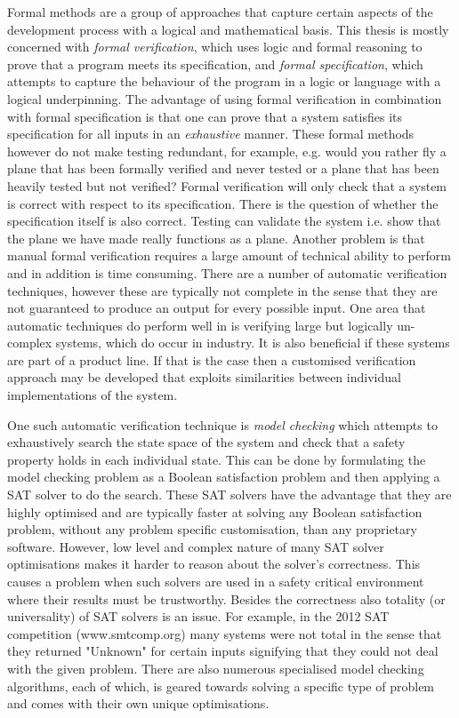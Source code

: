 Formal methods are a group of approaches that capture certain aspects of the development process with a logical and mathematical basis. This thesis is mostly concerned with \emph{formal verification}, which uses logic and formal reasoning to prove that a program meets its specification, and \emph{formal specification}, which attempts to capture the behaviour of the program in a logic or language with a logical underpinning. The advantage of using formal verification in combination with formal specification is that one can prove that a system satisfies its specification for all inputs in an \emph{exhaustive} manner. These formal methods however do not make testing redundant, for example, e.g. would you rather fly a plane that has been formally verified and never tested or a plane that has been heavily tested but not verified? Formal verification will only check that a system is correct with respect to its specification. There is the question of whether the specification itself is also correct. Testing can validate the system i.e. show that the plane we have made really functions as a plane. Another problem is that manual formal verification requires a large amount of technical ability to perform and in addition is time consuming. There are a number of automatic verification techniques, however these are typically not complete in the sense that they are not guaranteed to produce an output for every possible input. One area that automatic techniques do perform well in is verifying large but logically un-complex systems, which do occur in industry. It is also beneficial if these systems are part of a product line. If that is the case then a customised verification approach may be developed that exploits similarities between individual implementations of the system.

One such automatic verification technique is \emph{model checking} which attempts to exhaustively search the state space of the system and check that a safety property holds in each individual state. This can be done by formulating the model checking problem as a Boolean satisfaction problem and then applying a SAT solver to do the search. These SAT solvers have the advantage that they are highly optimised and are typically faster at solving any Boolean satisfaction problem, without any problem specific customisation, than any proprietary software. However, low level and complex nature of many SAT solver optimisations makes it harder to reason about the solver's correctness. This causes a problem when such solvers are used in a safety critical environment where their results must be trustworthy. Besides the correctness also
totality (or universality) of SAT solvers is an issue. For example, in the 2012 SAT competition (www.smtcomp.org) many systems were not total in the sense that they returned
"Unknown" for certain inputs signifying that they could not deal with the given problem.  There are also numerous specialised model checking algorithms, each of which, is geared towards solving a specific type of problem and comes with their own unique optimisations.


